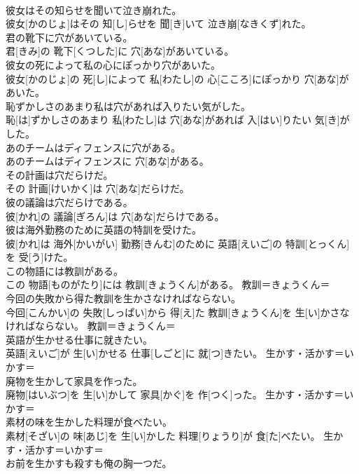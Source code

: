 \documentclass[8pt]{extreport}
\begin{document}
\begin{CJK}{UTF8}{min}
{\\	彼女はその知らせを聞いて泣き崩れた。	
\\	彼女[かのじょ]はその 知[し]らせを 聞[き]いて 泣き崩[なきくず]れた。	
\\	君の靴下に穴があいている。	
\\	君[きみ]の 靴下[くつした]に 穴[あな]があいている。	
\\	彼女の死によって私の心にぽっかり穴があいた。	
\\	彼女[かのじょ]の 死[し]によって 私[わたし]の 心[こころ]にぽっかり 穴[あな]があいた。	
\\	恥ずかしさのあまり私は穴があれば入りたい気がした。	
\\	恥[は]ずかしさのあまり 私[わたし]は 穴[あな]があれば 入[はい]りたい 気[き]がした。	
\\	あのチームはディフェンスに穴がある。	
\\	あのチームはディフェンスに 穴[あな]がある。	
\\	その計画は穴だらけだ。	
\\	その 計画[けいかく]は 穴[あな]だらけだ。	
\\	彼の議論は穴だらけである。	
\\	彼[かれ]の 議論[ぎろん]は 穴[あな]だらけである。	
\\	彼は海外勤務のために英語の特訓を受けた。	
\\	彼[かれ]は 海外[かいがい] 勤務[きんむ]のために 英語[えいご]の 特訓[とっくん]を 受[う]けた。	
\\	この物語には教訓がある。	
\\	この 物語[ものがたり]には 教訓[きょうくん]がある。	教訓＝きょうくん＝ 
\\	今回の失敗から得た教訓を生かさなければならない。	
\\	今回[こんかい]の 失敗[しっぱい]から 得[え]た 教訓[きょうくん]を 生[い]かさなければならない。	教訓＝きょうくん＝ 
\\	英語が生かせる仕事に就きたい。	
\\	英語[えいご]が 生[い]かせる 仕事[しごと]に 就[つ]きたい。	生かす・活かす＝いかす＝ 
\\	廃物を生かして家具を作った。	
\\	廃物[はいぶつ]を 生[い]かして 家具[かぐ]を 作[つく]った。	生かす・活かす＝いかす＝ 
\\	素材の味を生かした料理が食べたい。	
\\	素材[そざい]の 味[あじ]を 生[い]かした 料理[りょうり]が 食[た]べたい。	生かす・活かす＝いかす＝ 
\\	お前を生かすも殺すも俺の胸一つだ。	
}
\end{CJK}
\end{document}

